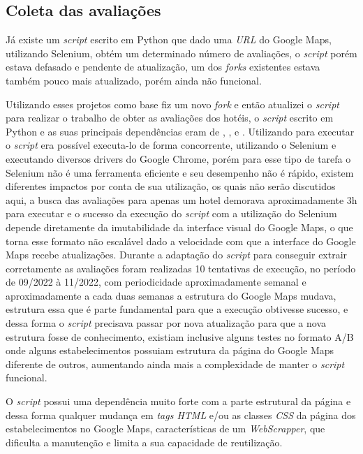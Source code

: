 \subsection{Coleta das avaliações}
\label{cap:metodologia:sec:conjunto_dados:sec:coleta_review}

Já existe um \emph{script} escrito em Python \cite{gaspa93scrapper2023} que dado uma \emph{URL} do Google Maps, utilizando Selenium, obtém um determinado número de avaliações, o \emph{script} porém estava defasado e pendente de atualização, um dos \emph{forks} existentes  estava também pouco mais atualizado, porém ainda não funcional.


Utilizando esses projetos como base fiz um novo \emph{fork} e então atualizei o \emph{script} para realizar o trabalho de obter as avaliações dos hotéis, o \emph{script} escrito em Python e as suas principais dependências eram de \cite{selenium2023}, ,  e . Utilizando  para executar o \emph{script} era possível executa-lo de forma concorrente, utilizando o Selenium e executando diversos drivers do Google Chrome, porém para esse tipo de tarefa o Selenium não é uma ferramenta eficiente e seu desempenho não é rápido, existem diferentes impactos por conta de sua utilização, os quais não serão discutidos aqui, a busca das avaliações para apenas um hotel demorava aproximadamente 3h para executar e o sucesso da execução do \emph{script} com a utilização do Selenium depende diretamente da imutabilidade da interface visual do Google Maps, o que torna esse formato não escalável dado a velocidade com que a interface do Google Maps recebe atualizações. Durante a adaptação do \emph{script} para conseguir extrair corretamente as avaliações foram realizadas 10 tentativas de execução, no período de 09/2022 à 11/2022, com periodicidade aproximadamente semanal e aproximadamente a cada duas semanas a estrutura do Google Maps mudava, estrutura essa que é parte fundamental para que a execução obtivesse sucesso, e dessa forma o \emph{script} precisava passar por nova atualização para que a nova estrutura fosse de conhecimento, existiam inclusive alguns testes no formato A/B onde alguns estabelecimentos possuiam estrutura da página do Google Maps diferente de outros, aumentando ainda mais a complexidade de manter o \emph{script} funcional.

O \emph{script} possui uma dependência muito forte com a parte estrutural da página e dessa forma qualquer mudança em \emph{tags HTML} e/ou as classes \emph{CSS} da página dos estabelecimentos no Google Maps, características de um \emph{WebScrapper}, que dificulta a manutenção e limita a sua capacidade de reutilização.

